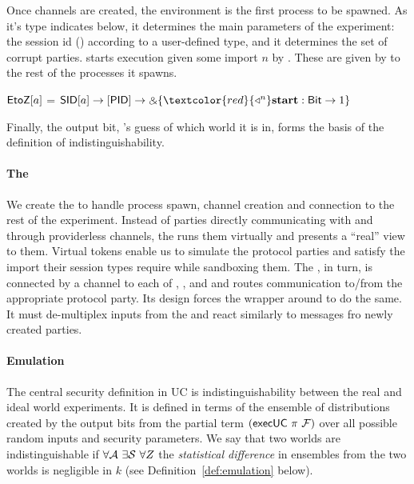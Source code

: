 Once channels are created, the environment \Z is the first process to be spawned.
As it's type  indicates below, it determines the main parameters of the experiment: the session id () according to a user-defined type, and 
it determines the set of corrupt parties. 
\Z starts execution given some import $n$ by .
These are given by  to the rest of the processes it spawns. 
\begin{center}
\vspace{-2mm}
\parbox{0cm}{
\begin{tabbing}
 $\mathsf{EtoZ}[a]$ = $\m{SID}[a] \arrow [\m{PID}] \arrow \echoice{\textcolor{red}{\getpot^n} \mb{start}: \m{Bit} \arrow 1}$
 \end{tabbing}}
\vspace{-2mm}
\end{center}
Finally, the output bit, \Z's guess of which world it is in, forms the basis of the definition of indistinguishability.

\paragraph*{\textbf{The \partywrapper}}
We create the \partywrapper to handle process spawn, channel creation and connection to the rest of the experiment.
Instead of parties directly communicating with \F and \Z through providerless channels, the \partywrapper runs them virtually and presents a ``real'' view to them.
Virtual tokens enable us to simulate the protocol parties and satisfy the import their session types require while sandboxing them. 
The \partywrapper, in turn, is connected by a channel to each of \F, \Z, and \A and routes communication to/from the appropriate protocol party. 
Its design forces the wrapper around \F to do the same. It must de-multiplex inputs from the \partywrapper and react similarly to messages fro newly created parties. 

\paragraph*{\textbf{Emulation}}
The central security definition in UC is indistinguishability between the real and ideal world experiments.
It is defined in terms of the ensemble of distributions created by the output bits from the partial term
$(\mathsf{execUC}\ \pi\ \mathcal{F})$ over all possible random inputs and security parameters. 
We say that two worlds are indistinguishable if $\forall \mathcal{A}\ \exists \mathcal{S}\ \forall Z$
the \emph{statistical difference} in ensembles from the two worlds is negligible in $k$ (see
Definition~\ref{def:emulation} below).

